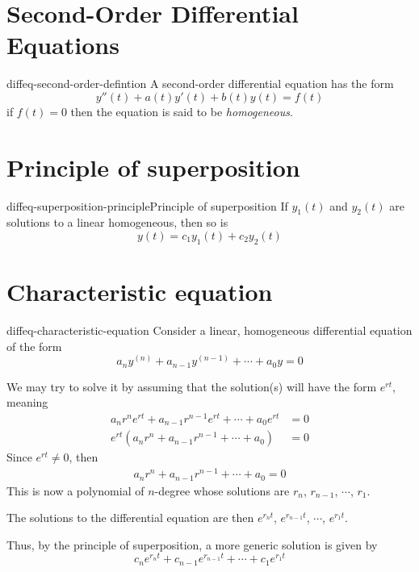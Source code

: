 \documentclass[preview]{standalone}
\begin{document}
\genpage

\section{Second-Order Differential Equations}

\begin{snippet}{diffeq-second-order-defintion}
A second-order differential equation has the form
\[
    y''(t)+a(t)y'(t)+b(t)y(t)=f(t)
\]
if \(f(t)=0\) then the equation is said to be \textit{homogeneous}.
\end{snippet}

\section{Principle of superposition}

\begin{snippettheorem}{diffeq-superposition-principle}{Principle of superposition}
    If \(y_1(t)\) and \(y_2(t)\) are solutions to a linear homogeneous,
    then so is
    \[
        y(t) = c_1 y_1(t) + c_2 y_2(t)
    \]
\end{snippettheorem}

\section{Characteristic equation}

\begin{snippet}{diffeq-characteristic-equation}
Consider a linear, homogeneous differential equation of the form
\[
    a_n y^{(n)} + a_{n-1} y^{(n-1)} + \cdots + a_0y = 0
\]

We may try to solve it by assuming that the solution(s) will have the form \(e^{rt}\),
meaning
\begin{align*}
    a_n r^n e^{rt}
    + a_{n-1} r^{n-1} e^{rt} + \cdots + a_0 e^{rt} & = 0 \\
    e^{rt} \left(
        a_n r^n + a_{n-1} r^{n-1} + \cdots + a_0
    \right) &= 0
\end{align*}
Since \(e^{rt} \neq 0\), then
\begin{align*}
    a_n r^n + a_{n-1} r^{n-1} + \cdots + a_0 = 0
\end{align*}
This is now a polynomial of \(n\)-degree whose solutions are
\(r_n\), \(r_{n-1}\), \(\cdots\), \(r_1\).

The solutions to the differential equation are then \(e^{r_n t}\),
\(e^{r_{n-1}t}\), \(\cdots\), \(e^{r_1 t}\).

Thus, by the principle of superposition, a more generic solution is given by
\[
    c_n e^{r_n t} +
    c_{n-1} e^{r_{n-1}t} +
    \cdots +
    c_1 e^{r_1 t}
\]
\end{snippet}

\end{document}
